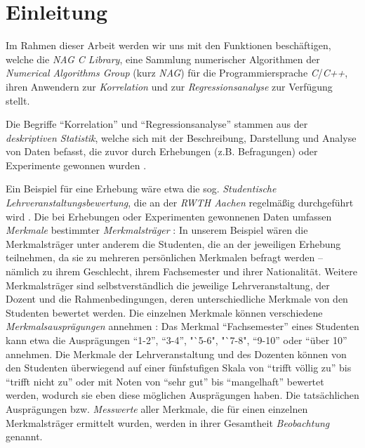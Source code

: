 \section{Einleitung}
\label{sec:einleitung}

Im Rahmen dieser Arbeit werden wir uns mit den Funktionen beschäftigen, welche die {\it NAG C Library}, eine Sammlung numerischer Algorithmen der {\it Numerical Algorithms Group} (kurz {\it NAG}) für die Programmiersprache {\it C}/{\it C++}, ihren Anwendern zur {\it Korrelation} und zur {\it Regressionsanalyse} zur Verfügung stellt.

Die Begriffe "`Korrelation"' und "`Regressionsanalyse"' stammen aus der {\it deskriptiven Statistik}, welche sich mit der Beschreibung, Darstellung und Analyse von Daten befasst, die zuvor durch Erhebungen (z.B. Befragungen) oder Experimente gewonnen wurden \cite[S. 11]{Fahrmeir2010}.

Ein Beispiel für eine Erhebung wäre etwa die sog. {\it Studentische Lehrveranstaltungsbewertung}, die an der {\it RWTH Aachen} regelmäßig durchgeführt wird \cite{rwth:slvb}. Die bei Erhebungen oder Experimenten gewonnenen Daten umfassen {\it Merkmale} bestimmter {\it Merkmalsträger} \cite[S. 15]{Fahrmeir2010}: In unserem Beispiel wären die Merkmalsträger unter anderem die Studenten, die an der jeweiligen Erhebung teilnehmen, da sie zu mehreren persönlichen Merkmalen befragt werden -- nämlich zu ihrem Geschlecht, ihrem Fachsemester und ihrer Nationalität. Weitere Merkmalsträger sind selbstverständlich die jeweilige Lehrveranstaltung, der Dozent und die Rahmenbedingungen, deren unterschiedliche Merkmale von den Studenten bewertet werden. Die einzelnen Merkmale können verschiedene {\it Merkmalsausprägungen} annehmen \cite[S. 15]{Fahrmeir2010}: Das Merkmal "`Fachsemester"' eines Studenten kann etwa die Ausprägungen "`1-2"', "`3-4"', "`5-6", "`7-8", "`9-10"' oder "`über 10"' annehmen. Die Merkmale der Lehrveranstaltung und des Dozenten können von den Studenten überwiegend auf einer fünfstufigen Skala von "`trifft völlig zu"' bis "`trifft nicht zu"' oder mit Noten von "`sehr gut"' bis "`mangelhaft"' bewertet werden, wodurch sie eben diese möglichen Ausprägungen haben. Die tatsächlichen Ausprägungen bzw. {\it Messwerte} aller Merkmale, die für einen einzelnen Merkmalsträger ermittelt wurden, werden in ihrer Gesamtheit {\it Beobachtung} genannt.

